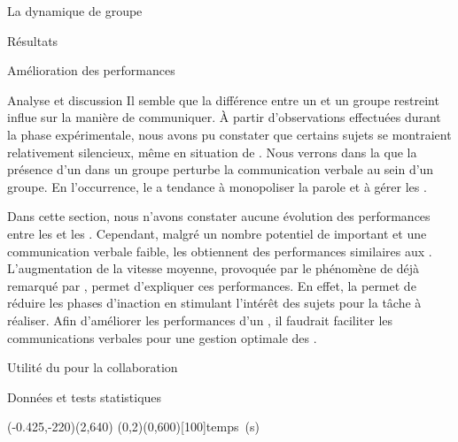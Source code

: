 \documentclass[myfrancais,ngerman,english,frenchb]{mythesis}
\begin{document}
\begin{mychapter}{La dynamique de groupe}
\begin{mysection}{Résultats}
\begin{mysubsection}{Amélioration des performances}
\begin{mysubsubsection}{Analyse et discussion}
					Il semble que la différence entre un  et un groupe restreint influe sur la manière de communiquer.
					À partir d'observations effectuées durant la phase expérimentale, nous avons pu constater que certains sujets se montraient relativement silencieux, même en situation de .
					Nous verrons dans la  que la présence d'un  dans un groupe perturbe la communication verbale au sein d'un groupe.
					En l'occurrence, le  a tendance à monopoliser la parole et à gérer les .

					Dans cette section, nous n'avons constater aucune évolution des performances entre les  et les .
					Cependant, malgré un nombre potentiel de  important et une communication verbale faible, les  obtiennent des performances similaires aux .
					L'augmentation de la vitesse moyenne, provoquée par le phénomène de  déjà remarqué par , permet d'expliquer ces performances.
					En effet, la  permet de réduire les phases d'inaction en stimulant l'intérêt des sujets pour la tâche à réaliser.
					Afin d'améliorer les performances d'un , il faudrait faciliter les communications verbales pour une gestion optimale des .
				\end{mysubsubsection}
			\end{mysubsection}
			\begin{mysubsection}{Utilité du \mybrainstorming pour la collaboration}
				\begin{mysubsubsection}{Données et tests statistiques}
					\begin{myfigure}
						\begin{myps}(-0.425,-220)(2,640)
							\myaxes(0,2){\mybrainstorming}(0,600)[100]{temps~(s)}
						\end{myps}
					\end{myfigure}


\end{mysubsubsection}
\end{mysubsection}
\end{mysection}
\end{mychapter}
\end{document}
